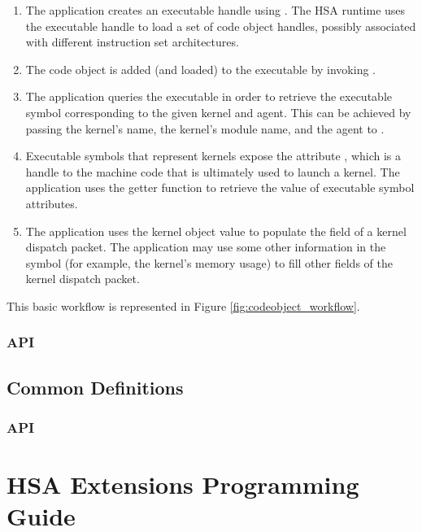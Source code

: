\documentclass[final,oneside]{book}
\begin{document}
\begin{enumerate}
\item The application creates an executable handle using
  . The HSA runtime uses the executable handle
   to load a set of code object handles, possibly
  associated with different instruction set architectures.
\item The code object is added (and loaded) to the executable by invoking
  .
\item The application queries the executable in order to retrieve the executable
  symbol corresponding to the given kernel and agent. This can be achieved
  by passing the kernel's name, the kernel's module name, and the agent to
  .
\item Executable symbols that represent kernels expose the attribute
  , which is a handle to the
  machine code that is ultimately used to launch a kernel. The application uses
  the getter function  to retrieve the
  value of executable symbol attributes.
\item The application uses the kernel object value to populate the
   field of a kernel dispatch
  packet. The application may use some other information in the symbol (for
  example, the kernel's memory usage) to fill other fields of the kernel
  dispatch packet.
\end{enumerate}

This basic workflow is represented in Figure \ref{fig:codeobject_workflow}.

\subsection{API}



\newpage

\section{Common Definitions}\label{sec:other}
\subsection{API}



\chapter{HSA Extensions Programming Guide}
\end{document}
